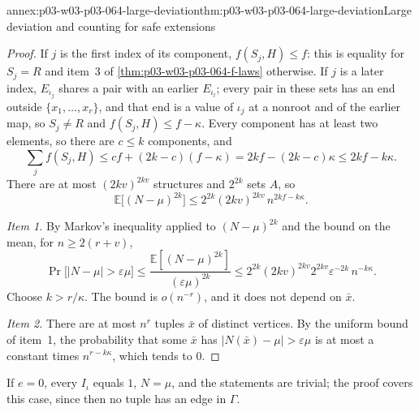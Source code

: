 \begin{annexitem}{annex:p03-w03-p03-064-large-deviation}{thm:p03-w03-p03-064-large-deviation}{Large deviation and counting for safe extensions}
\begin{proof}
If \(j\) is the first index of its component, \(f(S_j,H)\leq f\): this is
equality for \(S_j=R\) and item~3 of \cref{thm:p03-w03-p03-064-f-laws}
otherwise.  If \(j\) is a later index, \(E_{\iota_j}\) shares a pair with an
earlier \(E_{\iota_l}\); every pair in these sets has an end outside
\(\{x_1,\ldots,x_r\}\), and that end is a value of \(\iota_j\) at a nonroot
and of the earlier map, so \(S_j\neq R\) and \(f(S_j,H)\leq f-\kappa\).  Every
component has at least two elements, so there are \(c\leq k\) components, and
\[
  \sum_jf(S_j,H)\leq cf+(2k-c)(f-\kappa)=2kf-(2k-c)\kappa\leq2kf-k\kappa .
\]
There are at most \((2kv)^{2kv}\) structures and \(2^{2k}\) sets \(A\), so
\[
  \mathbb E\bigl[(N-\mu)^{2k}\bigr]\leq2^{2k}(2kv)^{2kv}\,n^{2kf-k\kappa}.
\]

\emph{Item 1.}  By Markov's inequality applied to \((N-\mu)^{2k}\) and the
bound on the mean, for \(n\geq2(r+v)\),
\[
  \Pr\bigl[|N-\mu|>\varepsilon\mu\bigr]\leq
  \frac{\mathbb E[(N-\mu)^{2k}]}{(\varepsilon\mu)^{2k}}\leq
  2^{2k}(2kv)^{2kv}2^{2kv}\varepsilon^{-2k}\,n^{-k\kappa}.
\]
Choose \(k>r/\kappa\).  The bound is \(o(n^{-r})\), and it does not depend on
\(\bar x\).

\emph{Item 2.}  There are at most \(n^r\) tuples \(\bar x\) of distinct
vertices.  By the uniform bound of item~1, the probability that some
\(\bar x\) has \(|N(\bar x)-\mu|>\varepsilon\mu\) is at most a constant times
\(n^{r-k\kappa}\), which tends to \(0\).
\end{proof}
If \(e=0\), every \(I_\iota\) equals \(1\), \(N=\mu\), and the statements are
trivial; the proof covers this case, since then no tuple has an edge in
\(\Gamma\).
\end{annexitem}

